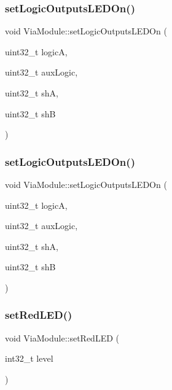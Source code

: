 \subsubsection{\texorpdfstring{set\+Logic\+Outputs\+L\+E\+D\+On()}{setLogicOutputsLEDOn()}\hspace{0.1cm}{\footnotesize\ttfamily [1/2]}}
{\footnotesize\ttfamily void Via\+Module\+::set\+Logic\+Outputs\+L\+E\+D\+On (\begin{DoxyParamCaption}\item[{uint32\+\_\+t}]{logicA,  }\item[{uint32\+\_\+t}]{aux\+Logic,  }\item[{uint32\+\_\+t}]{shA,  }\item[{uint32\+\_\+t}]{shB }\end{DoxyParamCaption})\hspace{0.3cm}{\ttfamily [inline]}}

\mbox{\label{class_via_module_ad676ccf2b9177bccfc7842967a792fa1}} 
\subsubsection{\texorpdfstring{set\+Logic\+Outputs\+L\+E\+D\+On()}{setLogicOutputsLEDOn()}\hspace{0.1cm}{\footnotesize\ttfamily [2/2]}}
{\footnotesize\ttfamily void Via\+Module\+::set\+Logic\+Outputs\+L\+E\+D\+On (\begin{DoxyParamCaption}\item[{uint32\+\_\+t}]{logicA,  }\item[{uint32\+\_\+t}]{aux\+Logic,  }\item[{uint32\+\_\+t}]{shA,  }\item[{uint32\+\_\+t}]{shB }\end{DoxyParamCaption})\hspace{0.3cm}{\ttfamily [inline]}}

\mbox{\label{class_via_module_a7a11c19ddf0c9a04061105a65d7c546b}} 
\subsubsection{\texorpdfstring{set\+Red\+L\+E\+D()}{setRedLED()}\hspace{0.1cm}{\footnotesize\ttfamily [1/2]}}
{\footnotesize\ttfamily void Via\+Module\+::set\+Red\+L\+ED (\begin{DoxyParamCaption}\item[{int32\+\_\+t}]{level }\end{DoxyParamCaption})\hspace{0.3cm}{\ttfamily [inline]}}

